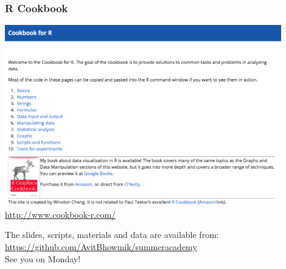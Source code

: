 \documentclass{beamer}
\begin{document}

\begin{frame}
\frametitle{R Cookbook}
\centering
\includegraphics[width=0.9\textwidth]{Figures/cookbook.png}\\
\href{http://www.cookbook-r.com/}{http://www.cookbook-r.com/}
\end{frame}


\begin{frame}
\centering
The slides, scripts, materials and data are available from:\\
\href{https://github.com/AvitBhowmik/summer_academy_15}{\alert{https://github.com/AvitBhowmik/summer\textunderscore academy}}\\
\vspace{1cm}
\Huge See you on Monday!
\end{frame}

\end{document}
